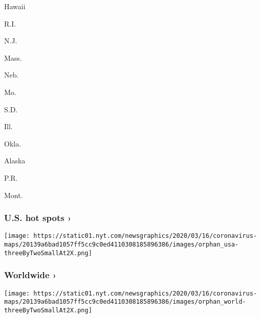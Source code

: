 \href{https://www.nytimes.com/interactive/2020/us/hawaii-coronavirus-cases.html}{}

Hawaii
\href{https://www.nytimes.com/interactive/2020/us/rhode-island-coronavirus-cases.html}{}

R.I.
\href{https://www.nytimes.com/interactive/2020/us/new-jersey-coronavirus-cases.html}{}

N.J.
\href{https://www.nytimes.com/interactive/2020/us/massachusetts-coronavirus-cases.html}{}

Mass.
\href{https://www.nytimes.com/interactive/2020/us/nebraska-coronavirus-cases.html}{}

Neb.
\href{https://www.nytimes.com/interactive/2020/us/missouri-coronavirus-cases.html}{}

Mo.
\href{https://www.nytimes.com/interactive/2020/us/south-dakota-coronavirus-cases.html}{}

S.D.
\href{https://www.nytimes.com/interactive/2020/us/illinois-coronavirus-cases.html}{}

Ill.
\href{https://www.nytimes.com/interactive/2020/us/oklahoma-coronavirus-cases.html}{}

Okla.
\href{https://www.nytimes.com/interactive/2020/us/alaska-coronavirus-cases.html}{}

Alaska
\href{https://www.nytimes.com/interactive/2020/us/puerto-rico-coronavirus-cases.html}{}

P.R.
\href{https://www.nytimes.com/interactive/2020/us/montana-coronavirus-cases.html}{}

Mont.

\href{https://www.nytimes.com/interactive/2020/us/coronavirus-us-cases.html}{}

\hypertarget{us-hot-spots-}{%
\subsubsection{U.S. hot spots ›}\label{us-hot-spots-}}

\texttt{[image: https://static01.nyt.com/newsgraphics/2020/03/16/coronavirus-maps/20139a6bad1057ff5cc9c0ed4110308185896386/images/orphan\_usa-threeByTwoSmallAt2X.png]}
\href{https://www.nytimes.com/interactive/2020/world/coronavirus-maps.html}{}

\hypertarget{worldwide-}{%
\subsubsection{Worldwide ›}\label{worldwide-}}

\texttt{[image: https://static01.nyt.com/newsgraphics/2020/03/16/coronavirus-maps/20139a6bad1057ff5cc9c0ed4110308185896386/images/orphan\_world-threeByTwoSmallAt2X.png]}

